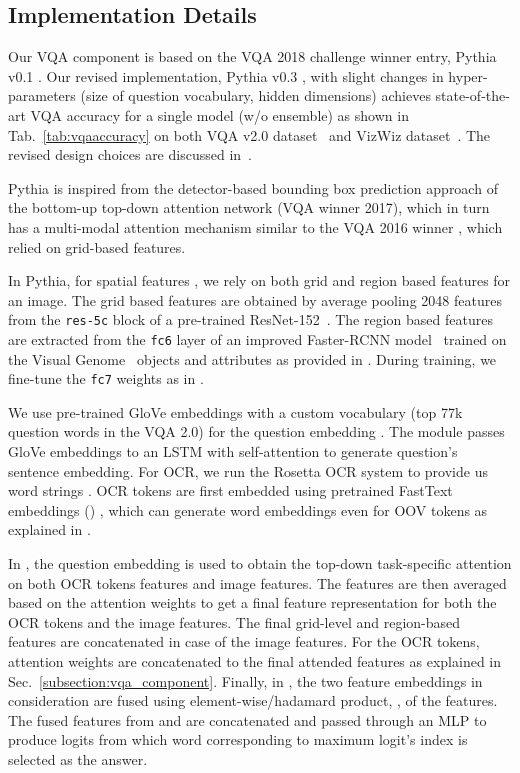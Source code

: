 \documentclass[10pt,twocolumn,letterpaper]{article}
\begin{document}
\subsection{Implementation Details}
\label{subsec:implementation}
Our VQA component is based on the VQA 2018 challenge winner entry, Pythia v0.1 \cite{jiang2018pythia}. Our revised implementation, Pythia v0.3 \cite{singhpythia}, with slight changes in hyper-parameters (\eg size of question vocabulary, hidden dimensions) achieves state-of-the-art VQA accuracy for a single model (\ie w/o ensemble) as shown in Tab.~\ref{tab:vqaaccuracy} on both VQA v2.0 dataset~\cite{goyal2017accurate} and VizWiz dataset~\cite{gurari2018vizwiz}. The revised design choices are discussed in~\cite{singhpythia}.

Pythia \cite{jiang2018pythia,singhpythia} is 
inspired from the detector-based bounding box prediction approach of the bottom-up top-down attention network \cite{anderson2017bottom} (VQA winner 2017), which in turn has a multi-modal attention mechanism similar to the VQA 2016 winner \cite{fukui2016multimodal}, which relied on  grid-based features.

In Pythia, for spatial features , we rely on both grid and region based features for an image. The grid based features are obtained by average pooling 2048 features from the \texttt{res-5c} block of a pre-trained ResNet-152~\cite{he2016deep}. The region based features are extracted from the \texttt{fc6} layer of an improved Faster-RCNN model~\cite{Detectron2018} trained on the Visual Genome~\cite{krishna2017visual} objects and attributes as provided in \cite{anderson2017bottom}. During training, we fine-tune the \texttt{fc7} weights as in \cite{jiang2018pythia}.

We use pre-trained GloVe embeddings with a custom vocabulary (top 77k question words in the VQA 2.0) for the question embedding \cite{pennington2014glove}. The  module passes GloVe embeddings to an LSTM \cite{hochreiter1997long} with self-attention \cite{yu2018beyond} to generate question's sentence embedding. For OCR, we run the Rosetta OCR system \cite{borisyuk2018rosetta} to provide us word strings .
OCR tokens are first embedded using pretrained FastText embeddings () \cite{joulin2016bag}, which can generate word embeddings even for OOV tokens as explained in \cite{joulin2016bag}.

In , the question embedding  is used to obtain the top-down \ie task-specific attention on both  OCR tokens features and  image features. The features are then averaged based on the attention weights to get a final feature representation for both the OCR tokens and the image features. The final grid-level and region-based features are concatenated in case of the image features. For the OCR tokens, attention weights are concatenated to the final attended features as explained in Sec.~\ref{subsection:vqa_component}. Finally, in , the two feature embeddings in consideration are fused using element-wise/hadamard product, , of the features. 
The fused features from  and  are concatenated and passed through an MLP to produce logits from which word corresponding to maximum logit's index is selected as the answer. 
 \vspace{-3mm}
\end{document}
